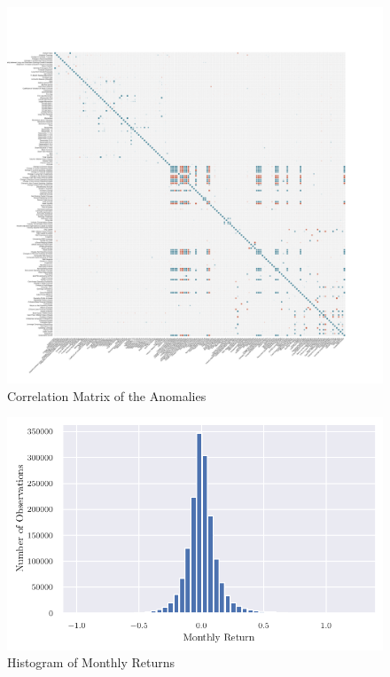 	\begin{center}
		\begin{figure}
			\includegraphics[width=\textwidth,height=\textheight,keepaspectratio]{Figures/corrplot.pdf}
			\caption{Correlation Matrix of the Anomalies}
			\label{fig:corrplot}
		\end{figure}
	\end{center}
	
	
	\begin{center}
		\begin{figure}
			\includegraphics{Figures/hist_returns.pdf}
			\caption{Histogram of Monthly Returns}
			\label{fig:hist_returns}
		\end{figure}
	\end{center}


		
	


